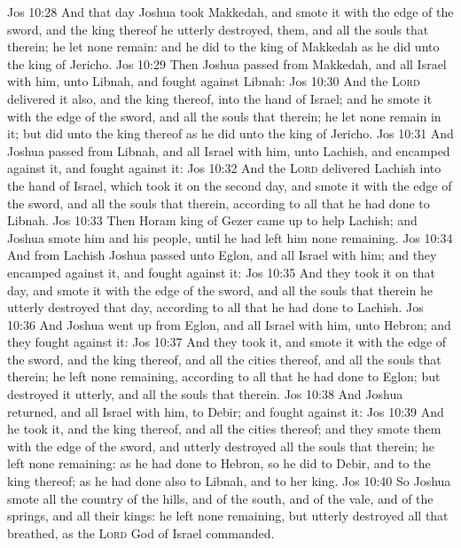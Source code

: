 \vs Jos 10:28 And that day Joshua took Makkedah, and smote it with the edge of the sword, and the king thereof he utterly destroyed, them, and all the souls that  therein; he let none remain: and he did to the king of Makkedah as he did unto the king of Jericho.
\vs Jos 10:29 Then Joshua passed from Makkedah, and all Israel with him, unto Libnah, and fought against Libnah:
\vs Jos 10:30 And the \textsc{Lord} delivered it also, and the king thereof, into the hand of Israel; and he smote it with the edge of the sword, and all the souls that  therein; he let none remain in it; but did unto the king thereof as he did unto the king of Jericho.
\vs Jos 10:31 And Joshua passed from Libnah, and all Israel with him, unto Lachish, and encamped against it, and fought against it:
\vs Jos 10:32 And the \textsc{Lord} delivered Lachish into the hand of Israel, which took it on the second day, and smote it with the edge of the sword, and all the souls that  therein, according to all that he had done to Libnah.
\vs Jos 10:33 Then Horam king of Gezer came up to help Lachish; and Joshua smote him and his people, until he had left him none remaining.
\vs Jos 10:34 And from Lachish Joshua passed unto Eglon, and all Israel with him; and they encamped against it, and fought against it:
\vs Jos 10:35 And they took it on that day, and smote it with the edge of the sword, and all the souls that  therein he utterly destroyed that day, according to all that he had done to Lachish.
\vs Jos 10:36 And Joshua went up from Eglon, and all Israel with him, unto Hebron; and they fought against it:
\vs Jos 10:37 And they took it, and smote it with the edge of the sword, and the king thereof, and all the cities thereof, and all the souls that  therein; he left none remaining, according to all that he had done to Eglon; but destroyed it utterly, and all the souls that  therein.
\vs Jos 10:38 And Joshua returned, and all Israel with him, to Debir; and fought against it:
\vs Jos 10:39 And he took it, and the king thereof, and all the cities thereof; and they smote them with the edge of the sword, and utterly destroyed all the souls that  therein; he left none remaining: as he had done to Hebron, so he did to Debir, and to the king thereof; as he had done also to Libnah, and to her king.
\vs Jos 10:40 So Joshua smote all the country of the hills, and of the south, and of the vale, and of the springs, and all their kings: he left none remaining, but utterly destroyed all that breathed, as the \textsc{Lord} God of Israel commanded.
